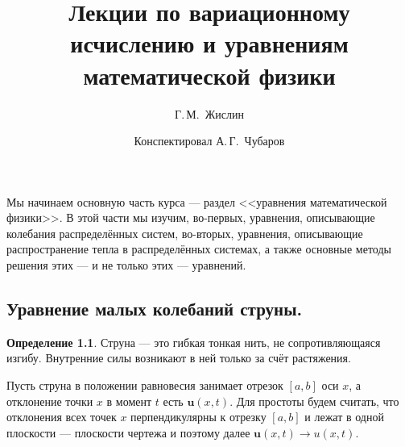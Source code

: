 \documentclass[12pt,a4paper,openany,fleqn]{book}
\theoremstyle{definition}
\newtheorem{_def}{Определение}[section]
\begin{document}
	\author{Г.\,М.~Жислин}
	\title{Лекции по вариационному исчислению и уравнениям математической физики}
	\date{Конспектировал А.\,Г.~Чубаров}
	
	
	
	\maketitle
	
	
	\renewcommand{\thepart}{\Asbuk{part}}
	\renewcommand{\thechapter}{\arabic{chapter}}
	\renewcommand{\thesection}{\arabic{section}}
	\renewcommand{\thesubsection}{\Roman{subsection}}
	\renewcommand{\thefootnote}{\roman{footnote}}
	\renewcommand{\phi}{\varphi}
	
	\setcounter{chapter}{10}
	\chapter{}
	\label{lecture11}
	
	Мы начинаем основную часть курса --- раздел <<уравнения математической физики>>. В этой части мы изучим, во-первых, уравнения, описывающие колебания распределённых систем, во-вторых, уравнения, описывающие распространение тепла в распределённых системах, а также основные методы решения этих --- и не только этих --- уравнений.
	
	\section{Уравнение малых колебаний струны.}
	\label{lecture11section1}
	
	\begin{_def}
		Струна --- это гибкая тонкая нить, не сопротивляющаяся изгибу. Внутренние силы возникают в ней только за счёт растяжения.
	\end{_def}
	 Пусть струна в положении равновесия занимает отрезок $[a,b]$ оси $x$, а отклонение точки $x$ в момент $t$ есть $\bm{u}(x,t)$. Для простоты будем считать, что отклонения всех точек $x$ перпендикулярны к отрезку $[a,b]$ и лежат в одной плоскости --- плоскости чертежа и поэтому далее $\bm{u}(x,t)\rightarrow u(x,t)$.
	 
	 
\end{document}
